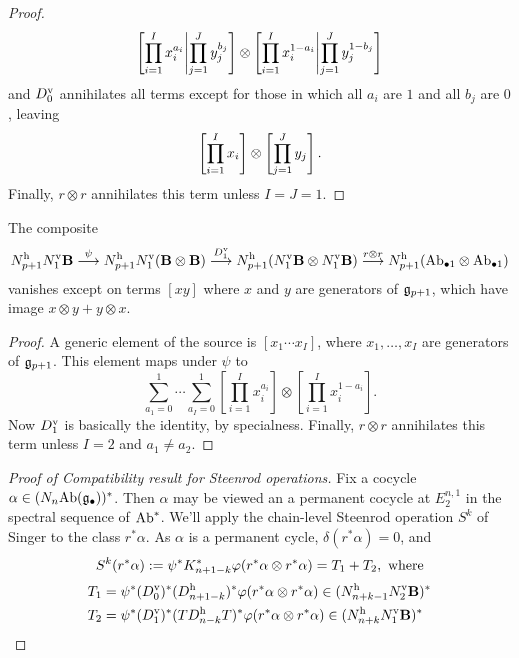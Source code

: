 \documentclass[10pt]{article}
\begin{document}
\begin{Lie Steenrods satisfy the Adem relation}
\begin{proof}
\[\left[\prod_{i=1}^Ix_i^{a_i}\middle|\prod_{\smash{j=1}}^Jy_j^{b_j}\right]\otimes
\left[\prod_{i=1}^Ix_i^{1-a_i}\middle|\prod_{\smash{j=1}}^Jy_j^{1-b_j}\right]\]
and $D_0^\textup{v}$ annihilates all terms except for those in which all $a_i$ are $1$ and all $b_j$ are $0$, leaving
\[\left[\prod_{i=1}^Ix_i\right]\otimes
\left[\prod_{\smash{j=1}}^Jy_j\right].\]
Finally, $r\otimes r$ annihilates this term unless $I=J=1$.
\end{proof}
\begin{lem}\label{secondCompositeLemma}
The composite
\[N_{p+1}^\textup{h}N_1^\textup{v}\textbf{B}\overset{\psi}{\to} N_{p+1}^\textup{h}N_1^\textup{v}(\textbf{B}\otimes\textbf{B})\overset{D_1^\textup{v}}{\to} N_{p+1}^\textup{h}(N_1^\textup{v}\textbf{B}\otimes N_1^\textup{v}\textbf{B})\overset{r\otimes r}{\to}N^\textup{h}_{p+1}(\textup{Ab}_{\bullet 1}\otimes \textup{Ab}_{\bullet 1})\]
vanishes except on terms $[xy]$ where $x$ and $y$ are generators of $\frakg_{p+1}$, which have image $x\otimes y+y\otimes x$.
\end{lem}
\begin{proof}
A generic element of the source is $[x_1\cdots x_I]$, where $x_1,\ldots,x_I$ are generators of $\frakg_{p+1}$. This element maps under $\psi$ to
\[\sum_{a_1=0}^1\cdots \sum_{a_I=0}^1
\left[\prod_{i=1}^Ix_i^{a_i}\right]\otimes
\left[\prod_{i=1}^Ix_i^{1-a_i}\right].\]
Now $D_1^\textup{v}$ is basically the identity, by specialness.
Finally, $r\otimes r$ annihilates this term unless $I=2$ and $a_1\neq a_2$.
\end{proof}

\begin{proof}[Proof of Compatibility result for Steenrod operations]
Fix a cocycle $\alpha\in (N_{n}\textup{Ab}(\frakg_\bullet))^*$. %
Then $\alpha$ may be viewed an a permanent cocycle at $E_2^{n,1}$ in the spectral sequence of $\textup{Ab}^*$. We'll apply the chain-level Steenrod operation $S^k$ of Singer to the class $r^*\alpha$. As $\alpha$ is a permanent cycle, $\delta(r^*\alpha)=0$, and
\[S^k(r^*\alpha):=\psi^*K^*_{n+1-k}\oldphi(r^*\alpha\otimes r^*\alpha)=T_1+T_2,\textup{ where}\]
\begin{alignat*}{2}
T_1
&=
\psi^*(D^\textup{v}_0)^*(D^\textup{h}_{n+1-k})^*
\oldphi(r^*\alpha\otimes r^*\alpha)\in (N^\textup{h}_{n+k-1}N^\textup{v}_2\textbf{B})^*%
\\
T_2
&=
\psi^*(D^\textup{v}_1)^*(TD^\textup{h}_{n-k}T)^*
\oldphi(r^*\alpha\otimes r^*\alpha)\in (N^\textup{h}_{n+k}N^\textup{v}_1\textbf{B})^*
\end{alignat*}


\end{proof}
\end{Lie Steenrods satisfy the Adem relation}
\end{document}
